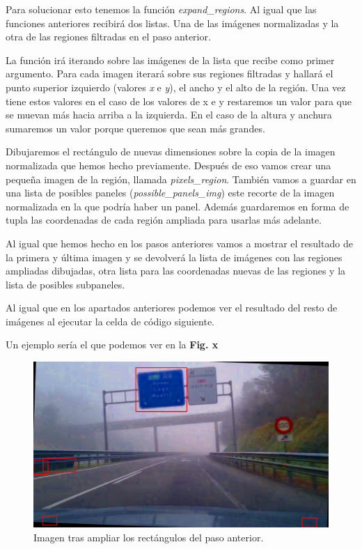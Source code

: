 \documentclass[a4paper, 12pt]{article}
\begin{document}
Para solucionar esto tenemos la función \textit{expand\_regions}. Al igual que las funciones anteriores recibirá dos listas. Una de las imágenes normalizadas y la otra de las regiones filtradas en el paso anterior.

La función irá iterando sobre las imágenes de la lista que recibe como primer argumento. Para cada imagen iterará sobre sus regiones filtradas y hallará el punto superior izquierdo (valores \textit{x} e \textit{y}), el ancho y el alto de la región. Una vez tiene estos valores en el caso de los valores de x e y restaremos un valor para que se muevan más hacia arriba a la izquierda. En el caso de la altura y anchura sumaremos un valor porque queremos que sean más grandes. 

Dibujaremos el rectángulo de nuevas dimensiones sobre la copia de la imagen normalizada que hemos hecho previamente. Después de eso vamos crear una pequeña imagen de la región, llamada \textit{pixels\_region}. 
También vamos a guardar en una lista de posibles paneles (\textit{possible\_panels\_img}) este recorte de la imagen normalizada en la que podría haber un panel. Además guardaremos en forma de tupla las coordenadas de cada región ampliada para usarlas más adelante. 

Al igual que hemos hecho en los pasos anteriores vamos a mostrar el resultado de la primera y última imagen y se devolverá la lista de imágenes con las regiones ampliadas dibujadas, otra lista para las coordenadas nuevas de las regiones y la lista de posibles subpaneles. 

Al igual que en los apartados anteriores podemos ver el resultado del resto de imágenes al ejecutar la celda de código siguiente. 

Un ejemplo sería el que podemos ver en la \textbf{Fig. x}

\begin{figure}[h]
	\centering
	\includegraphics[width=0.6\linewidth]{img/RectangulosFiltradosExtendidos}
	\caption{Imagen tras ampliar los rectángulos del paso anterior.}
	\label{fig:RectangulosFiltradosExtendidos}
\end{figure}
\end{document}
